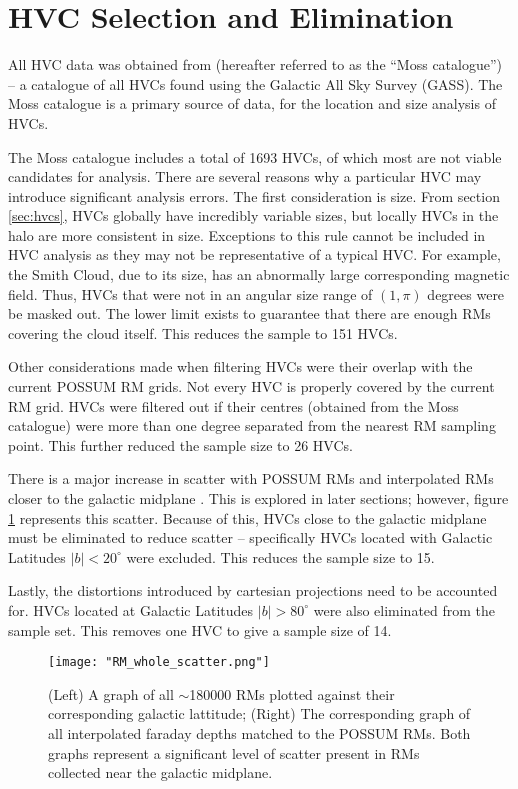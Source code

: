 \section{HVC Selection and Elimination}
\label{sec:hvc_sel}

All HVC data was obtained from \cite{ID3} (hereafter referred to as the “Moss catalogue”) – a catalogue of all HVCs found using the Galactic All Sky Survey (GASS). The Moss catalogue is a primary source of data, for the location and size analysis of HVCs.


The Moss catalogue includes a total of 1693 HVCs, of which most are not viable candidates for analysis. There are several reasons why a particular HVC may introduce significant analysis errors. The first consideration is size. From section \ref{sec:hvcs}, HVCs globally have incredibly variable sizes, but locally HVCs in the halo are more consistent in size. Exceptions to this rule cannot be included in HVC analysis as they may not be representative of a typical HVC. For example, the Smith Cloud, due to its size, has an abnormally large corresponding magnetic field. Thus, HVCs that were not in an angular size range of $(1,\pi)$ degrees were be masked out. The lower limit exists to guarantee that there are enough RMs covering the cloud itself. This reduces the sample to 151 HVCs.


Other considerations made when filtering HVCs were their overlap with the current POSSUM RM grids. Not every HVC is properly covered by the current RM grid. HVCs were filtered out if their centres (obtained from the Moss catalogue) were more than one degree separated from the nearest RM sampling point. This further reduced the sample size to 26 HVCs.


There is a major increase in scatter with POSSUM RMs and interpolated RMs closer to the galactic midplane \citep{ID21}. This is explored in later sections; however, figure \ref{fig:rm_scatter} represents this scatter. Because of this, HVCs close to the galactic midplane must be eliminated to reduce scatter – specifically HVCs located with Galactic Latitudes $|b|<20^{\circ}$ were excluded. This reduces the sample size to 15.


Lastly, the distortions introduced by cartesian projections need to be accounted for. HVCs located at Galactic Latitudes $|b|>80^{\circ}$ were also eliminated from the sample set. This removes one HVC to give a sample size of 14.

\begin{figure}
    \texttt{[image: "RM\_whole\_scatter.png"]}
    \centering
    \caption{(Left) A graph of all $\sim$180000 RMs plotted against their corresponding galactic lattitude; (Right) The corresponding graph of all interpolated faraday depths matched to the POSSUM RMs. Both graphs represent a significant level of scatter present in RMs collected near the galactic midplane.}
    \label{fig:rm_scatter}
\end{figure}

